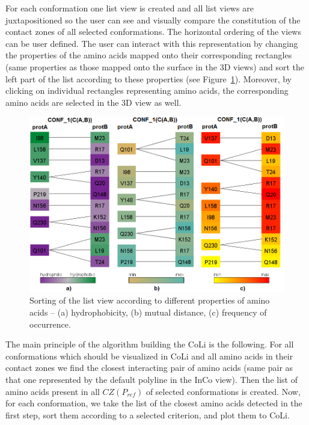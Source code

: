 \documentclass[journal]{vgtc}                %
\begin{document}
For each conformation one list view is created and all list views are juxtapositioned so the user can see and visually compare the constitution of the contact zones of all selected conformations.
The horizontal ordering of the views can be user defined.
The user can interact with this representation by changing the properties of the amino acids mapped onto their corresponding rectangles (same properties as those mapped onto the surface in the 3D views) and sort the left part of the list according to these properties (see Figure~\ref{fig:sorting}).
Moreover, by clicking on individual rectangles representing amino acids, the corresponding amino acids are selected in the 3D view as well.

\begin{figure}[bt]
  \centering
  \includegraphics[width=1.0\columnwidth]{sorting.png}
  \caption{Sorting of the list view according to different properties of amino acids -- (a) hydrophobicity, (b) mutual distance, (c) frequency of occurrence.}
  \label{fig:sorting}
\end{figure}

The main principle of the algorithm building the CoLi is the following.
For all conformations which should be visualized in CoLi and all amino acids in their contact zones we find the closest interacting pair of amino acids (same pair as that one represented by the default polyline in the InCo view).
Then the list of amino acids present in all $CZ(P_{ref})$ of selected conformations is created.
Now, for each conformation, we take the list of the closest amino acids detected in the first step, sort them according to a selected criterion, and plot them to CoLi.
\end{document}
